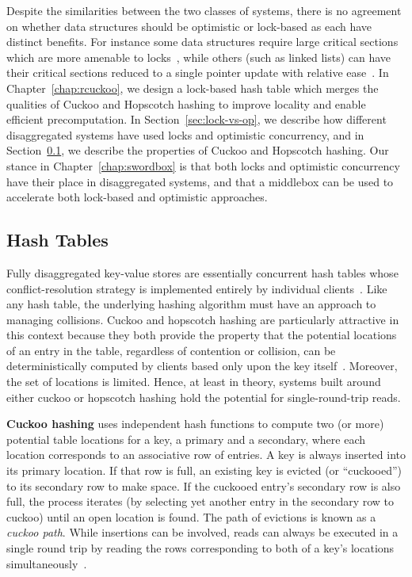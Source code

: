\documentclass[12pt]{ucsddissertation}
\begin{document}
Despite the similarities between the two classes of systems, there is no agreement on whether data
structures should be optimistic or lock-based as each have distinct benefits. For instance some data
structures require large critical sections which are more amenable to locks~\cite{hopscotch}, while
others (such as linked lists) can have their critical sections reduced to a single pointer update
with relative ease~\cite{clover}. In Chapter~\ref{chap:rcuckoo}, we design a lock-based hash table
which merges the qualities of Cuckoo and Hopscotch hashing to improve locality and enable efficient
precomputation. In Section~\ref{sec:lock-vs-op}, we describe how different disaggregated systems
have used locks and optimistic concurrency, and in Section~\ref{sec:hashtables}, we describe the
properties of Cuckoo and Hopscotch hashing. Our stance in Chapter~\ref{chap:swordbox} is that both
locks and optimistic concurrency have their place in disaggregated systems, and that a middlebox can
be used to accelerate both lock-based and optimistic approaches.



\subsection{Hash Tables}
\label{sec:hashtables}

Fully disaggregated key-value stores are essentially concurrent hash tables whose
conflict-resolution strategy is implemented entirely by individual clients~\cite{rolex,fusee,race}.
Like any hash table, the underlying hashing algorithm must have an approach to managing collisions.
Cuckoo and hopscotch hashing are particularly attractive in this context because they both provide
the property that the potential locations of an entry in the table, regardless of contention or
collision, can be deterministically computed by clients based only upon the key
itself~\cite{farm,memc3,hopscotch,cuckoo-improvements,pilaf,cuckoo}. Moreover, the set of locations
is limited. Hence, at least in theory, systems built around either cuckoo or hopscotch hashing hold
the potential for single-round-trip reads.

\textbf{Cuckoo hashing} uses independent hash functions to compute two (or more) potential table
locations for a key, a primary and a secondary, where each location corresponds to an associative
row of entries.  A key is always inserted into its primary location. If that row is full, an
existing key is evicted (or “cuckooed”) to its secondary row to make space. If the cuckooed entry’s
secondary row is also full, the process iterates (by selecting yet another entry in the secondary
row to cuckoo) until an open location is found. The path of evictions is known as a \textit{cuckoo
path}. While insertions can be involved, reads can always be executed in a single round trip by
reading the rows corresponding to both of a key’s locations simultaneously~\cite{pilaf}.
\end{document}
